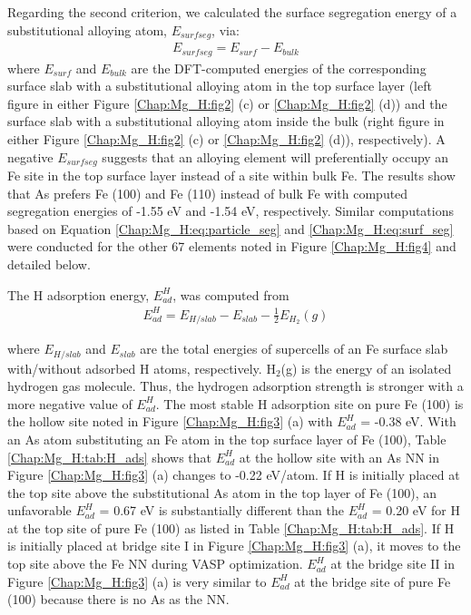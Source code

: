 Regarding the second criterion, we calculated the surface segregation energy of a substitutional alloying atom, $E_{surf seg}$, via:
\begin{align}
 E_{surf seg} = E_{surf} - E_{bulk}
 \label{Chap:Mg_H:eq:surf_seg}
\end{align}
where $E_{surf}$ and $E_{bulk}$ are the \ac{DFT}-computed energies of the corresponding surface slab with a substitutional alloying atom in the top surface layer (left figure in either Figure \ref{Chap:Mg_H:fig2} (c) or \ref{Chap:Mg_H:fig2} (d)) and the surface slab with a substitutional alloying atom inside the bulk (right figure in either Figure \ref{Chap:Mg_H:fig2} (c) or \ref{Chap:Mg_H:fig2} (d)), respectively). A negative $E_{surf seg}$ suggests that an alloying element will preferentially occupy an Fe site in the top surface layer instead of a site within bulk Fe. The results show that As prefers Fe (100) and Fe (110) instead of bulk Fe with computed segregation energies of -1.55 eV and -1.54 eV, respectively. Similar computations based on Equation \ref{Chap:Mg_H:eq:particle_seg} and \ref{Chap:Mg_H:eq:surf_seg} were conducted for the other 67 elements noted in Figure \ref{Chap:Mg_H:fig4} and detailed below.

The H adsorption energy, $E_{ad}^H$, was computed from
\begin{align}
 E_{ad}^{H} = E_{H/slab} - E_{slab} - \frac{1}{2}E_{H_2}(g)
 \label{Chap:Mg_H:eq:H_ads}
\end{align}

where $E_{H/slab}$ and $E_{slab}$ are the total energies of supercells of an Fe surface slab with/without adsorbed H atoms, respectively. $\text{H}_2$(g) is the energy of an isolated hydrogen gas molecule. Thus, the hydrogen adsorption strength is stronger with a more negative value of $E_{ad}^H$. The most stable H adsorption site on pure Fe (100) is the hollow site noted in Figure \ref{Chap:Mg_H:fig3} (a) with $E_{ad}^H$ = -0.38 eV. With an As atom substituting an Fe atom in the top surface layer of Fe (100), Table \ref{Chap:Mg_H:tab:H_ads} shows that $E_{ad}^H$ at the hollow site with an As NN in Figure \ref{Chap:Mg_H:fig3} (a) changes to -0.22 eV/atom. If H is initially placed at the top site above the substitutional As atom in the top layer of Fe (100), an unfavorable $E_{ad}^H$ = 0.67 eV is substantially different than the $E_{ad}^H$ = 0.20 eV for H at the top site of pure Fe (100) as listed in Table \ref{Chap:Mg_H:tab:H_ads}. If H is initially placed at bridge site I in Figure \ref{Chap:Mg_H:fig3} (a), it moves to the top site above the Fe NN during \ac{VASP} optimization. $E_{ad}^H$ at the bridge site II in Figure \ref{Chap:Mg_H:fig3} (a) is very similar to $E_{ad}^H$ at the bridge site of pure Fe (100) because there is no As as the NN.

